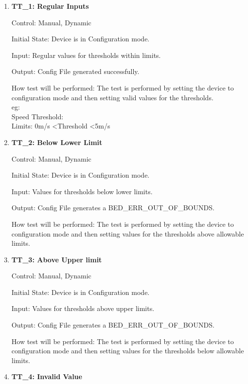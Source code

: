 \documentclass[12pt, titlepage]{article}
\begin{document}
\begin{enumerate}
	\item{\textbf{TT\_1: Regular Inputs} \\}\label{TT1}
	
		Control: Manual, Dynamic
							
		Initial State: Device is in Configuration mode.
							
		Input: Regular values for thresholds within limits.
		
		Output: Config File generated successfully.
		
		How test will be performed: The test is performed by setting the device to configuration mode and then setting valid values for the thresholds.\\
		eg: \\
		Speed Threshold:\\
		Limits: 0m/s \textless Threshold \textless 5m/s

	\item{\textbf{TT\_2: Below Lower Limit} \\}\label{TT2}
	
		Control: Manual, Dynamic
							
		Initial State: Device is in Configuration mode.
							
		Input: Values for thresholds below lower limits.
		
		Output: Config File generates a BED\_ERR\_OUT\_OF\_BOUNDS.

		How test will be performed: The test is performed by setting the device to configuration mode and then setting values for the thresholds above allowable limits.

	\item{\textbf{TT\_3: Above Upper limit }\\}\label{TT3}
	
		Control: Manual, Dynamic
							
		Initial State: Device is in Configuration mode.
							
		Input: Values for thresholds above upper limits.
		
		Output: Config File generates a BED\_ERR\_OUT\_OF\_BOUNDS.
		
		How test will be performed: The test is performed by setting the device to configuration mode and then setting values for the thresholds below allowable limits.

	\item{\textbf{TT\_4: Invalid Value} \\}\label{TT4}
	

\end{enumerate}
\end{document}
